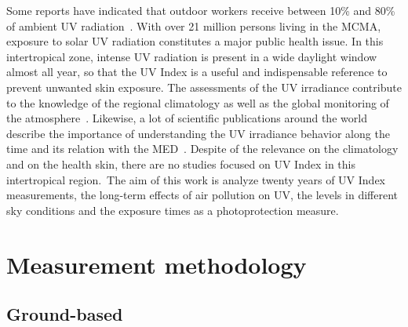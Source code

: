 \documentclass{article}
\begin{document}
Some reports have indicated that outdoor workers receive between 10\%
and 80\% of ambient UV radiation~\cite{Larko1983,Makgabutlane_2015,Silva_2016,Moldovan_2020}. With over 21
million persons living in the MCMA, exposure to solar UV radiation
constitutes a major public health issue. In this intertropical zone,
intense UV radiation is present in a wide daylight window almost all
year, so that the UV Index is a useful and indispensable reference to
prevent unwanted skin exposure. The assessments of the UV irradiance
contribute to the knowledge of the regional climatology as well as the
global monitoring of the atmosphere~\cite{Madronich_1993,Fioletov_2004,Staiger_2005,Luccini_2006,Herman_2010,Bech_2014,Utrillas_2018}. Likewise, a lot
of scientific publications around the world describe the importance of
understanding the UV irradiance behavior along the time and its relation
with the MED~\cite{Calaf_2011,RIVAS_2015,Lehmann_2019,Parra_2019,Cadet_2019}. Despite of the relevance on the
climatology and on the health skin, there are no studies focused on UV
Index in this intertropical region.~The aim of this work is analyze
twenty years of UV Index measurements, the long-term effects of air
pollution on UV, the levels in different sky conditions and the exposure
times as a photoprotection measure.

\section*{Measurement methodology}

{\label{321063}}

\subsection*{Ground-based~}

{\label{339070}}
\end{document}
